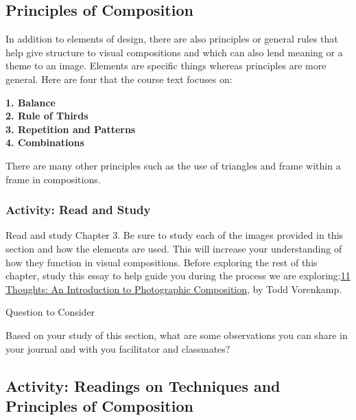 \documentclass[
]{book}
\begin{document}
\hypertarget{principles-of-composition}{%
\subsection*{Principles of Composition}\label{principles-of-composition}}

In addition to elements of design, there are also principles or general rules that help give structure to visual compositions and which can also lend meaning or a theme to an image. Elements are specific things whereas principles are more general. Here are four that the course text focuses on:

\textbf{1. Balance}\\
\textbf{2. Rule of Thirds}\\
\textbf{3. Repetition and Patterns}\\
\textbf{4. Combinations}

There are many other principles such as the use of triangles and frame within a frame in compositions.

\hypertarget{activity-read-and-study}{%
\subsubsection*{Activity: Read and Study}\label{activity-read-and-study}}

\begin{reflect}
Read and study Chapter 3. Be sure to study each of the images provided in this section and how the elements are used. This will increase your understanding of how they function in visual compositions.
Before exploring the rest of this chapter, study this essay to help guide you during the process we are exploring:\href{https://www.bhphotovideo.com/explora/photography/tips-and-solutions/11-thoughts-introduction-photographic-composition}{11 Thoughts: An Introduction to Photographic Composition}, by Todd Vorenkamp.

{Question to Consider}

Based on your study of this section, what are some observations you can share in your journal and with you facilitator and classmates?
\end{reflect}

\hypertarget{activity-readings-on-techniques-and-principles-of-composition}{%
\subsection*{Activity: Readings on Techniques and Principles of Composition}\label{activity-readings-on-techniques-and-principles-of-composition}}
\end{document}

